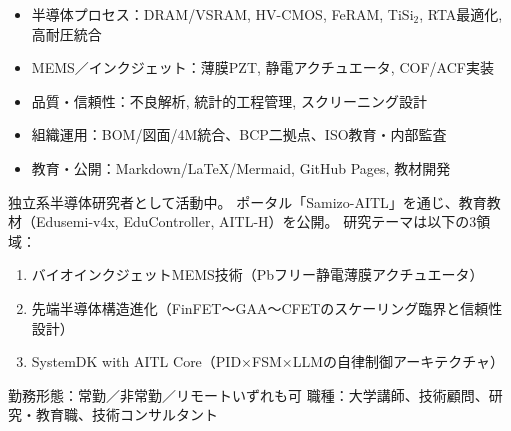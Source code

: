 \documentclass[engine=luatex,ja=standard,11pt]{bxjsarticle}
\begin{document}
\begin{itemize}
  \item 半導体プロセス：DRAM/VSRAM, HV-CMOS, FeRAM, TiSi$_2$, RTA最適化, 高耐圧統合
  \item MEMS／インクジェット：薄膜PZT, 静電アクチュエータ, COF/ACF実装
  \item 品質・信頼性：不良解析, 統計的工程管理, スクリーニング設計
  \item 組織運用：BOM/図面/4M統合、BCP二拠点、ISO教育・内部監査
  \item 教育・公開：Markdown/LaTeX/Mermaid, GitHub Pages, 教材開発
\end{itemize}

独立系半導体研究者として活動中。  
ポータル「Samizo-AITL」を通じ、教育教材（Edusemi-v4x, EduController, AITL-H）を公開。  
研究テーマは以下の3領域：
\begin{enumerate}
  \item バイオインクジェットMEMS技術（Pbフリー静電薄膜アクチュエータ）
  \item 先端半導体構造進化（FinFET～GAA～CFETのスケーリング臨界と信頼性設計）
  \item SystemDK with AITL Core（PID×FSM×LLMの自律制御アーキテクチャ）
\end{enumerate}

勤務形態：常勤／非常勤／リモートいずれも可  
職種：大学講師、技術顧問、研究・教育職、技術コンサルタント
\end{document}
